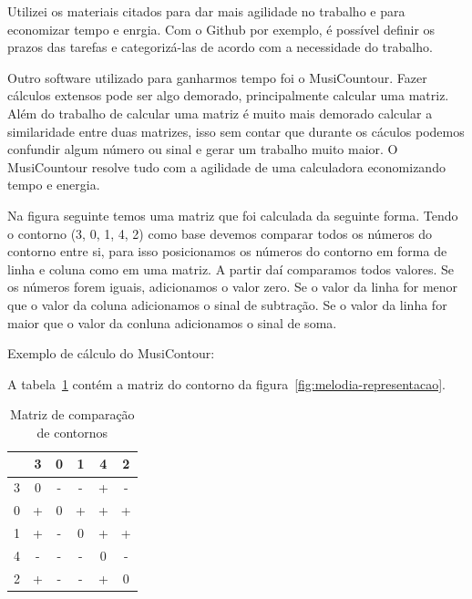 \documentclass[11pt]{article}
\begin{document}
Utilizei os materiais citados para dar mais agilidade no trabalho e para
economizar tempo e enrgia. Com o Github por exemplo, é possível definir os 
prazos das tarefas e categorizá-las de acordo com a necessidade do trabalho.


Outro software utilizado para ganharmos tempo foi o MusiCountour. Fazer cálculos
extensos pode ser algo demorado, principalmente calcular uma matriz. Além do trabalho
de calcular uma matriz é muito mais demorado calcular a similaridade entre duas matrizes,
isso sem contar que durante os cáculos podemos confundir algum número ou sinal e gerar um
trabalho muito maior. O MusiCountour resolve tudo com a agilidade de uma calculadora
economizando tempo e energia.

  Na figura seguinte temos uma matriz que foi calculada da seguinte forma.
  Tendo o contorno (3, 0, 1, 4, 2) como base devemos comparar todos os 
  números do contorno entre si, para isso posicionamos os números do contorno em
  forma de linha e coluna como em uma matriz. A partir daí comparamos todos valores.
  Se os números forem iguais, adicionamos o valor zero. Se o valor da linha for 
  menor que o valor da coluna adicionamos  o sinal de subtração. Se o valor da 
  linha for maior que o valor da conluna adicionamos o sinal de soma.
  
Exemplo de cálculo do MusiContour:

A tabela~\ref{tab:matriz-comparacao-contornos} contém a matriz do
contorno da figura~\ref{fig:melodia-representacao}.

\begin{table}
  \centering
  \begin{tabular}{c|ccccc}
    &3&0&1&4&2\\
    \hline
    3&0&-&-&+&-\\
    0&+&0&+&+&+\\
    1&+&-&0&+&+\\
    4&-&-&-&0&-\\
    2&+&-&-&+&0\\
  \end{tabular}
  \caption{Matriz de comparação de contornos}
  \label{tab:matriz-comparacao-contornos}
\end{table}
\end{document}
